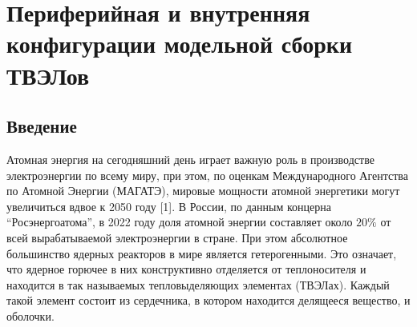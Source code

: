 \chapter{Периферийная и внутренняя конфигурации модельной сборки ТВЭЛов}\label{ch:ch4}
%
\section{Введение}\label{ch4:intro}
%
%
Атомная энергия на сегодняшний день играет важную роль в производстве электроэнергии по всему миру, при этом, по оценкам Международного Агентства по Атомной Энергии (МАГАТЭ), мировые мощности атомной энергетики могут увеличиться вдвое к 2050 году [1].
%
В России, по данным концерна ``Росэнергоатома'', в 2022 году доля атомной энергии составляет около $20\%$ от всей вырабатываемой электроэнергии в стране. 
%
При этом абсолютное большинство ядерных реакторов в мире является гетерогенными.
%
Это означает, что ядерное горючее в них конструктивно отделяется от теплоносителя и находится в так называемых тепловыделяющих элементах (ТВЭЛах).
%
Каждый такой элемент состоит из сердечника, в котором находится делящееся вещество, и оболочки.
% 



